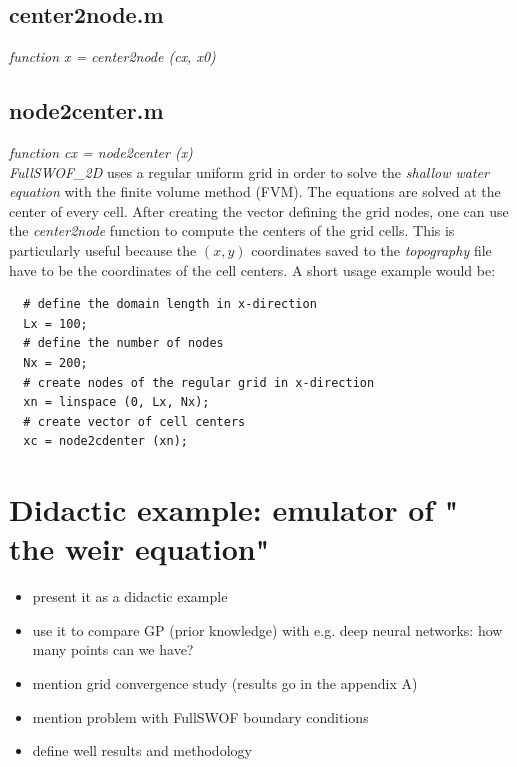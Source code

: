 \subsection*{center2node.m}
\textit{function x = center2node (cx, x0)}\\




\subsection*{node2center.m}
\textit{function cx = node2center (x)}\\

\textit{FullSWOF\_2D} uses a regular uniform grid in order to solve the \emph{shallow water equation} with the finite volume method (FVM).
The equations are solved at the center of every cell.
After creating the vector defining the grid nodes, one can use the \textit{center2node} function to compute the centers of the grid cells.
This is particularly useful because the $(x,y)$ coordinates saved to the \textit{topography} file have to be the coordinates of the cell centers.
A short usage example would be:

\begin{lstlisting}
  # define the domain length in x-direction
  Lx = 100;
  # define the number of nodes
  Nx = 200;
  # create nodes of the regular grid in x-direction
  xn = linspace (0, Lx, Nx);
  # create vector of cell centers
  xc = node2cdenter (xn);
\end{lstlisting}



\section{Didactic example: emulator  of " the weir equation"}

\begin{itemize}
\itemsep0em
  \item present it as a didactic example
  \item use it to compare GP (prior knowledge) with e.g. deep neural networks: how many points can we have?
  \item mention grid convergence study (results go in the appendix A)
  \item mention problem with FullSWOF boundary conditions
  \item define well results and methodology
\end{itemize}


